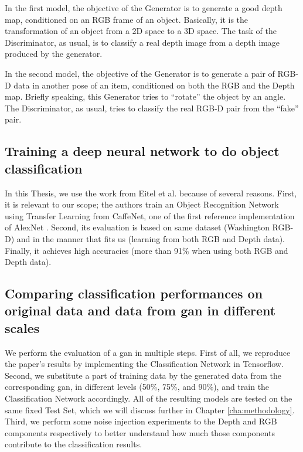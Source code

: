In the first model, the objective of the Generator is to generate a good depth map,
conditioned on an RGB frame of an object. Basically, it is the transformation of an object
from a 2D space to a 3D space. The task of the Discriminator, as usual, is to classify a
real depth image from a depth image produced by the generator.

In the second model, the objective of the Generator is to generate a pair of RGB-D data in
another pose of an item, conditioned on both the RGB and the Depth map. Briefly speaking,
this Generator tries to ``rotate'' the object by an angle. The Discriminator, as usual,
tries to classify the real RGB-D pair from the ``fake'' pair.

\subsection{Training a deep neural network to do object classification}
In this Thesis, we use the work from Eitel et al. \cite{eitel} because of several
reasons. First, it is relevant to our scope; the authors train an Object Recognition
Network using Transfer Learning from CaffeNet, one of the first reference implementation
of AlexNet \cite{alexnet}. Second, its
evaluation is based on same dataset (Washington RGB-D) and in the manner that fits us
(learning from both RGB and Depth data). Finally, it achieves high accuracies (more than
91\% when using both RGB and Depth data).

\subsection{Comparing classification performances on original data and data from
	\acrshort{gan} in different scales}
We perform the evaluation of a \acrshort{gan} in multiple steps. First of all, we
reproduce the paper's \cite{eitel} results by implementing the Classification
Network in Tensorflow.  Second, we substitute a part of training data by the generated
data from the corresponding \acrshort{gan}, in different levels (50\%, 75\%, and 90\%),
and train the Classification Network accordingly. All of the resulting models are tested
on the same fixed Test Set, which we will discuss further in Chapter
\ref{cha:methodology}. Third, we perform some noise injection experiments to the Depth and
RGB components respectively to better understand how much those components contribute to
the classification results.


